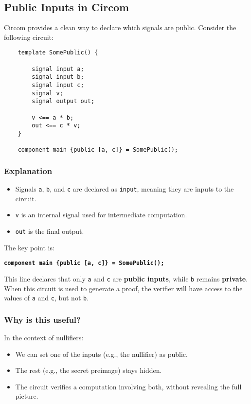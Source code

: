 \documentclass{article}
\begin{document}
\subsection*{Public Inputs in Circom}

Circom provides a clean way to declare which signals are public. Consider the following circuit:

\begin{verbatim}
	template SomePublic() {
		
		signal input a;
		signal input b;
		signal input c;
		signal v;
		signal output out;
		
		v <== a * b; 
		out <== c * v;
	}
	
	component main {public [a, c]} = SomePublic();
\end{verbatim}

\subsubsection*{Explanation}

\begin{itemize}
	\item Signals \texttt{a}, \texttt{b}, and \texttt{c} are declared as \texttt{input}, meaning they are inputs to the circuit.
	\item \texttt{v} is an internal signal used for intermediate computation.
	\item \texttt{out} is the final output.
\end{itemize}

The key point is:
\begin{center}
	\textbf{\texttt{component main \{public [a, c]\} = SomePublic();}}
\end{center}

This line declares that only \texttt{a} and \texttt{c} are \textbf{public inputs}, while \texttt{b} remains \textbf{private}. When this circuit is used to generate a proof, the verifier will have access to the values of \texttt{a} and \texttt{c}, but not \texttt{b}.

\subsubsection*{Why is this useful?}

In the context of nullifiers:
\begin{itemize}
	\item We can set one of the inputs (e.g., the nullifier) as public.
	\item The rest (e.g., the secret preimage) stays hidden.
	\item The circuit verifies a computation involving both, without revealing the full picture.
\end{itemize}
\end{document}
